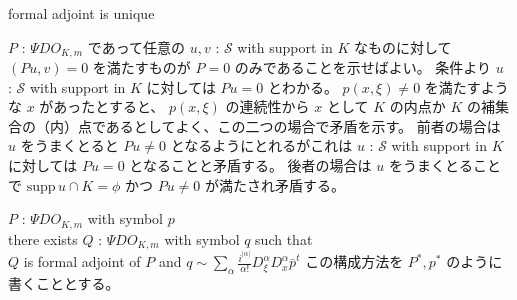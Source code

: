 \begin{Theorem}
\itemprop
  \Then formal adjoint is unique
\end{Theorem}

\begin{Proof}
\itemprof
  \(P\) : \(\Psi DO_{K,m}\) であって任意の \(u,v\) : \(\mathscr{S}\) with support in \(K\) なものに対して \((Pu , v) = 0\) を満たすものが \(P = 0\) のみであることを示せばよい。
  条件より \(u\) : \(\mathscr{S}\) with support in \(K\) に対しては \(P u = 0\) とわかる。
  \(p(x,\xi) \not = 0\) を満たすような \(x\) があったとすると、 \(p(x,\xi)\) の連続性から \(x\) として \(K\) の内点か \(K\) の補集合の（内）点であるとしてよく、この二つの場合で矛盾を示す。
  前者の場合は \(u\) をうまくとると \(Pu \not = 0\) となるようにとれるがこれは \(u\) : \(\mathscr{S}\) with support in \(K\) に対しては \(P u = 0\) となることと矛盾する。
  後者の場合は \(u\) をうまくとることで \(\text{supp} \, u \cap K = \phi\) かつ \(P u \not = 0\) が満たされ矛盾する。
\end{Proof}

\begin{Theorem}
\itemprop
  \For \(P\) : \(\Psi DO_{K,m}\) with symbol \(p\) \\
  \Then there exists \(Q\) : \(\Psi DO_{K,m}\) with symbol \(q\) such that \\
  \(Q\) is formal adjoint of \(P\) and \(q \sim \sum_{\alpha} \frac{i ^ {\lvert \alpha \rvert}}{\alpha !} D^\alpha_{\xi} D^\alpha_x \bar{p}^t\)
\itemnote
  この構成方法を \(P^* , p^*\) のように書くこととする。
\end{Theorem}

